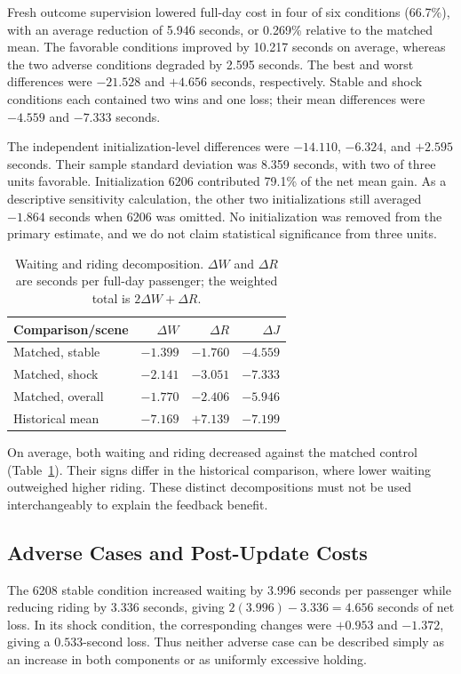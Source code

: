 \documentclass[journal]{IEEEtran}
\begin{document}
Fresh outcome supervision lowered full-day cost in four of six conditions (66.7\%), with an average reduction of 5.946 seconds, or 0.269\% relative to the matched mean. The favorable conditions improved by 10.217 seconds on average, whereas the two adverse conditions degraded by 2.595 seconds. The best and worst differences were $-21.528$ and $+4.656$ seconds, respectively. Stable and shock conditions each contained two wins and one loss; their mean differences were $-4.559$ and $-7.333$ seconds.

The independent initialization-level differences were $-14.110$, $-6.324$, and $+2.595$ seconds. Their sample standard deviation was 8.359 seconds, with two of three units favorable. Initialization 6206 contributed 79.1\% of the net mean gain. As a descriptive sensitivity calculation, the other two initializations still averaged $-1.864$ seconds when 6206 was omitted. No initialization was removed from the primary estimate, and we do not claim statistical significance from three units.

\begin{table}[t]
\centering\caption{Waiting and riding decomposition. $\Delta W$ and $\Delta R$ are seconds per full-day passenger; the weighted total is $2\Delta W+\Delta R$.}
\label{tab:decomposition}
\begin{tabular}{lrrr}\toprule
Comparison/scene & $\Delta W$ & $\Delta R$ & $\Delta J$\\\midrule
Matched, stable & $-1.399$ & $-1.760$ & $-4.559$\\
Matched, shock & $-2.141$ & $-3.051$ & $-7.333$\\
Matched, overall & $-1.770$ & $-2.406$ & $-5.946$\\
Historical mean & $-7.169$ & $+7.139$ & $-7.199$\\\bottomrule
\end{tabular}
\end{table}

On average, both waiting and riding decreased against the matched control (Table~\ref{tab:decomposition}). Their signs differ in the historical comparison, where lower waiting outweighed higher riding. These distinct decompositions must not be used interchangeably to explain the feedback benefit.

\subsection{Adverse Cases and Post-Update Costs}
The 6208 stable condition increased waiting by 3.996 seconds per passenger while reducing riding by 3.336 seconds, giving $2(3.996)-3.336=4.656$ seconds of net loss. In its shock condition, the corresponding changes were $+0.953$ and $-1.372$, giving a $0.533$-second loss. Thus neither adverse case can be described simply as an increase in both components or as uniformly excessive holding.
\end{document}
